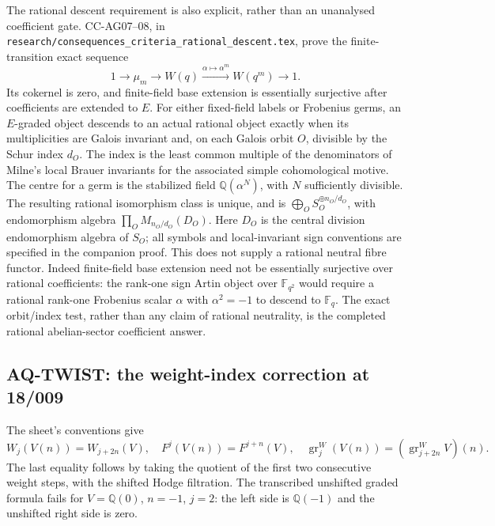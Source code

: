 \documentclass[11pt,a4paper]{article}
\theoremstyle{definition}\newtheorem{definition}[theorem]{Definition}
\theoremstyle{remark}\newtheorem{remark}[theorem]{Remark}
\begin{document}
The rational descent requirement is also explicit, rather than an
unanalysed coefficient gate. CC-AG07--08, in
\texttt{research/consequences\_criteria\_rational\_descent.tex},
prove the finite-transition exact sequence
\[
 1\longrightarrow\mu_m\longrightarrow W(q)
  \xrightarrow{\alpha\mapsto\alpha^m}W(q^m)
  \longrightarrow1.
\]
Its cokernel is zero, and finite-field base extension is
essentially surjective after coefficients are extended to $E$.
For either fixed-field labels or Frobenius germs, an $E$-graded
object descends to an actual rational object exactly when its
multiplicities are Galois invariant and, on each Galois orbit
$O$, divisible by the Schur index $d_O$. The index is the least
common multiple of the denominators of Milne's local Brauer
invariants for the associated simple cohomological motive.
The centre for a germ is the stabilized field
$\mathbb Q(\alpha^N)$, with $N$ sufficiently divisible.
The resulting rational isomorphism class is unique, and is
$\bigoplus_O S_O^{\oplus n_O/d_O}$, with endomorphism algebra
$\prod_O M_{n_O/d_O}(D_O)$. Here $D_O$ is the central division
endomorphism algebra of $S_O$; all symbols and local-invariant
sign conventions are specified in the companion proof.
This does not supply a rational neutral fibre functor.
Indeed finite-field base extension need not be essentially
surjective over rational coefficients: the rank-one sign Artin
object over $\mathbb F_{q^2}$ would require a rational rank-one
Frobenius scalar $\alpha$ with $\alpha^2=-1$ to descend to
$\mathbb F_q$. The exact orbit/index test, rather than any
claim of rational neutrality, is the completed rational
abelian-sector coefficient answer.

\subsection{AQ-TWIST: the weight-index correction at 18/009}
The sheet's conventions give
\[
 W_j(V(n))=W_{j+2n}(V),\quad F^j(V(n))=F^{j+n}(V),\quad
 \operatorname{gr}^W_j(V(n))
 =(\operatorname{gr}^W_{j+2n}V)(n).                             \tag{AQ.6}
\]
The last equality follows by taking the quotient of the
first two consecutive weight steps, with the shifted Hodge
filtration. The transcribed unshifted graded formula fails
for $V=\mathbb Q(0)$, $n=-1$, $j=2$: the left side is
$\mathbb Q(-1)$ and the unshifted right side is zero.
\end{document}
